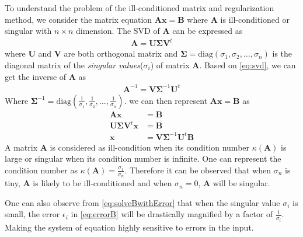 			To understand the problem of the ill-conditioned matrix and regularization method, we consider the matrix equation $\boldsymbol{Ax}=\boldsymbol{B}$ where $\boldsymbol{A}$ is ill-conditioned or singular with $n\times n$ dimension.
			The \gls{SVD} of $\boldsymbol{A}$ can be expressed as 
			\begin{align}
				\boldsymbol{A} = \boldsymbol{U\Sigma V}^t
				\label{eq:svd}
			\end{align}
			where $\boldsymbol{U}$ and $\boldsymbol{V}$ are both orthogonal matrix and $\boldsymbol{\Sigma}=\mathrm{diag}(\sigma_1,\sigma_2,\dots,\sigma_n)$ is the diagonal matrix of the \emph{singular values}($\sigma_i$) of matrix $\boldsymbol{A}$.
			Based on \cref{eq:svd}, we can get the inverse of $\boldsymbol{A}$ as 
			\begin{align}
				\boldsymbol{A}^{-1}= \boldsymbol{V\Sigma}^{-1}\boldsymbol{U}^t
				\label{eq:svdInverse}
			\end{align}
			Where $
			\boldsymbol{\Sigma}^{-1} = \mathrm{diag}(\frac{1}{\sigma_1},\frac{1}{\sigma_2},\dots,\frac{1}{\sigma_n})$.
			we can then represent $\boldsymbol{Ax}=\boldsymbol{B}$ as
			\begin{align}
				\boldsymbol{Ax}&=\boldsymbol{B} \nonumber\\
				\boldsymbol{U\Sigma V}^t\boldsymbol{x}&=\boldsymbol{B} \nonumber\\
				\boldsymbol{x}&=\boldsymbol{V\Sigma}^{-1}\boldsymbol{U}^t\boldsymbol{B}
				\label{eq:solveBwithError}
			\end{align}
			A matrix $\boldsymbol{A}$ is considered as ill-condition when its condition number $\kappa(\boldsymbol{A})$ is large or singular when its condition number is infinite. 
			One can represent the condition number as $\kappa(\boldsymbol{A})=\frac{\sigma_1}{\sigma_n}$.
			Therefore it can be observed that when $\sigma_n$ is tiny, $\boldsymbol{A}$ is likely to be ill-conditioned and when $\sigma_n=0$, $\boldsymbol{A}$ will be singular. 
			
			One can also observe from \cref{eq:solveBwithError} that when the singular value $\sigma_i$ is small, the error $\epsilon_i$ in \cref{eq:errorB} will be drastically magnified by a factor of $\frac{1}{\sigma_i}$. 
			Making the system of equation highly sensitive to errors in the input.
			
